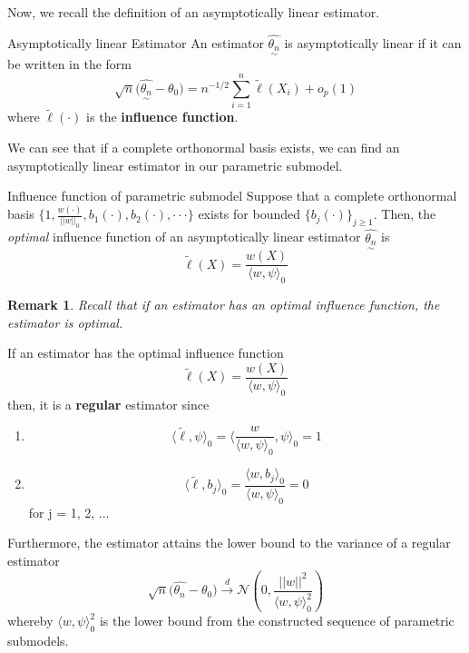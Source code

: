 \documentclass[twoside]{article}
\newtheorem{remark}[theorem]{Remark}
\newcommand{\utilde}{\underset{\sim}}
\begin{document}
Now, we recall the definition of an asymptotically linear estimator.

\begin{definition_exam}{Asymptotically linear Estimator}{} An estimator $\hat{\utilde{\theta_{n}}}$ is asymptotically linear if it can be written in the form 
\begin{equation}
  \sqrt{n} \big( \hat{\utilde{\theta_{n}}} - \theta_0 \big) = n^{-1/2}\sum_{i=1}^{n}\tilde{\ell}(X_i) + o_p(1)
\end{equation}
where $\tilde{\ell}(\cdot)$ is the \textbf{influence function}.
\end{definition_exam}

We can see that if a complete orthonormal basis exists, we can find an asymptotically linear estimator in our parametric submodel.

\begin{proposition_exam}{Influence function of parametric submodel}{} Suppose that a complete orthonormal basis $\{1, \frac{w(\cdot)}{||w||_0}, b_1(\cdot), b_2(\cdot), \cdot \cdot \cdot \}$ exists for bounded $\{b_j(\cdot)\}_{j \geq 1}.$ Then, the 
\textit{optimal} influence function of an asymptotically linear estimator $\hat{\utilde{\theta_{n}}}$ is 
\begin{equation}
  \tilde{\ell}(X) = \frac{w(X)}{\langle w, \psi \rangle_{0}}
\end{equation}
\end{proposition_exam}
\begin{remark}
Recall that if an estimator has an optimal influence function, the estimator is optimal.
\end{remark}


If an estimator has the optimal influence function
$$
\tilde{\ell}(X) = \frac{w(X)}{\langle w, \psi \rangle_{0}}
$$
then, it is a \textbf{regular} estimator since 
\begin{enumerate}
\item $$
\langle \tilde{\ell}, \psi \rangle_0 = \langle \frac{w}{\langle w, \psi \rangle_0}, \psi \rangle_0 = 1
$$
\item 
$$
\langle \tilde{\ell}, b_j \rangle_0 = \frac{\langle w, b_j \rangle_{0}}{\langle w, \psi \rangle_0} = 0
$$
for j = 1, 2, ...
\end{enumerate}

Furthermore, the estimator attains the lower bound to the variance of a regular estimator 
\begin{equation}
  \sqrt{n}\big(\hat{\theta_{n}} - \theta_0 \big) \xrightarrow{d} \mathcal{N}(0, \frac{||w||^2}{\langle w, \psi \rangle_{0}^{2}})
\end{equation}
whereby $\langle w, \psi \rangle_{0}^{2}$ is the lower bound from the constructed sequence of parametric submodels.
\end{document}
